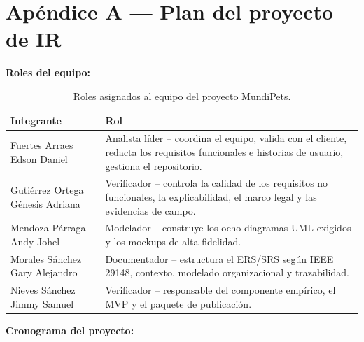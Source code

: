 \documentclass[journal,onecolumn]{IEEEtran}
\begin{document}
	\newpage
	\printbibliography[title={Referencias}]
	
	\newpage
	\appendix
	
	\section*{Apéndice A --- Plan del proyecto de IR}
	\label{ap:plan}
	
	\textbf{Roles del equipo:}
	
	\begin{table}[H]
		\caption{Roles asignados al equipo del proyecto MundiPets.}
		\centering
		\begin{tabularx}{\linewidth}{|X|X|}
			\hline
			\textbf{Integrante} & \textbf{Rol} \\
			\hline
			Fuertes Arraes Edson Daniel & Analista líder -- coordina el equipo, valida con el cliente, redacta los requisitos funcionales e historias de usuario, gestiona el repositorio. \\
			\hline
			Gutiérrez Ortega Génesis Adriana & Verificador -- controla la calidad de los requisitos no funcionales, la explicabilidad, el marco legal y las evidencias de campo. \\
			\hline
			Mendoza Párraga Andy Johel & Modelador -- construye los ocho diagramas UML exigidos y los mockups de alta fidelidad. \\
			\hline
			Morales Sánchez Gary Alejandro & Documentador -- estructura el ERS/SRS según IEEE 29148, contexto, modelado organizacional y trazabilidad. \\
			\hline
			Nieves Sánchez Jimmy Samuel & Verificador -- responsable del componente empírico, el MVP y el paquete de publicación. \\
			\hline
		\end{tabularx}
	\end{table}
	
	\textbf{Cronograma del proyecto:}
	
\end{document}
